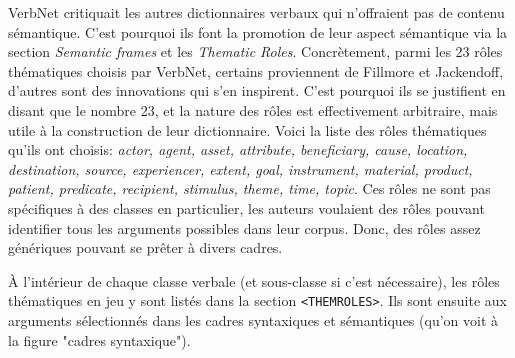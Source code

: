 VerbNet critiquait les autres dictionnaires verbaux qui n'offraient pas de contenu sémantique. C'est pourquoi ils font la promotion de leur aspect sémantique via la section \emph{Semantic frames} et les \emph{Thematic Roles}\citep{SchulerVerbnetBroadcoverageComprehensive2005}. Concrètement, parmi les 23 rôles thématiques choisis par VerbNet, certains proviennent de Fillmore et Jackendoff, d'autres sont des innovations qui s'en inspirent. C'est pourquoi ils se justifient en disant que le nombre 23, et la nature des rôles est effectivement arbitraire, mais utile à la construction de leur dictionnaire. Voici la liste des rôles thématiques qu'ils ont choisis: \emph{actor, agent, asset, attribute, beneficiary, cause, location, destination, source, experiencer, extent, goal, instrument, material, product, patient, predicate, recipient, stimulus, theme, time, topic}. Ces rôles ne sont pas spécifiques à des classes en particulier, les auteurs voulaient des rôles pouvant identifier tous les arguments possibles dans leur corpus. Donc, des rôles assez génériques pouvant se prêter à divers cadres.


	

À l'intérieur de chaque classe verbale (et sous-classe si c'est nécessaire), les rôles thématiques en jeu y sont listés dans la section \lstinline|<THEMROLES>|. Ils sont ensuite  aux arguments sélectionnés dans les cadres syntaxiques et sémantiques (qu'on voit à la figure "cadres syntaxique").

